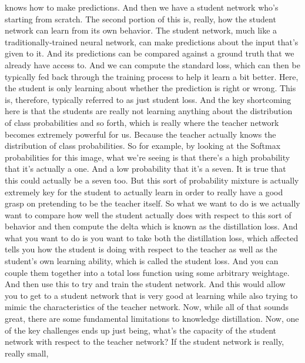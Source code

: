 {{{{{    knows how to make predictions.
    And then we have a student network who's starting from scratch.
    The second portion of this is, really, how the student network
    can learn from its own behavior.
    The student network, much like a traditionally-trained neural network,
    can make predictions about the input that's given to it.
    And its predictions can be compared against a ground truth
    that we already have access to.
    And we can compute the standard loss, which
    can then be typically fed back through the training process
    to help it learn a bit better.
    Here, the student is only learning about whether the prediction
    is right or wrong.
    This is, therefore, typically referred to as just student loss.
    And the key shortcoming here is that the students are really not learning
    anything about the distribution of class probabilities
    and so forth, which is really where the teacher network becomes extremely
    powerful for us.
    Because the teacher actually knows the distribution of class probabilities.
    So for example, by looking at the Softmax probabilities
    for this image, what we're seeing is that there's a high probability
    that it's actually a one.
    And a low probability that it's a seven.
    It is true that this could actually be a seven too.
    But this sort of probability mixture is actually extremely key for the student
    to actually learn in order to really have a good grasp on pretending
    to be the teacher itself.
    So what we want to do is we actually want
    to compare how well the student actually does
    with respect to this sort of behavior and then compute the delta which
    is known as the distillation loss.
    And what you want to do is you want to take both the distillation loss, which
    affected tells you how the student is doing with respect to the teacher
    as well as the student's own learning ability, which
    is called the student loss.
    And you can couple them together into a total loss function
    using some arbitrary weightage.
    And then use this to try and train the student network.
    And this would allow you to get to a student network that
    is very good at learning while also trying
    to mimic the characteristics of the teacher network.
    Now, while all of that sounds great, there
    are some fundamental limitations to knowledge distillation.
    Now, one of the key challenges ends up just being,
    what's the capacity of the student network with respect to the teacher
    network?
    If the student network is really, really small,
}}}}}
